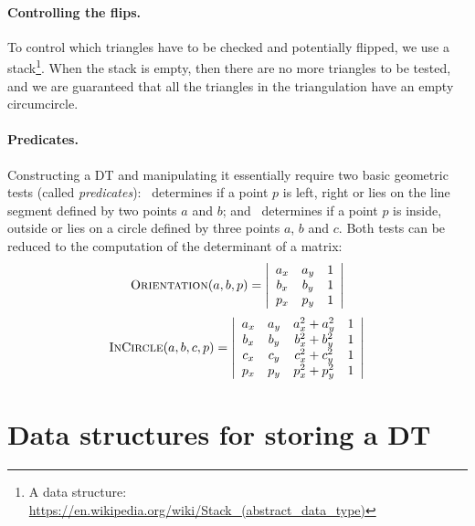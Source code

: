 \paragraph{Controlling the flips.}
To control which triangles have to be checked and potentially flipped, we use a stack\footnote{A data structure: \url{https://en.wikipedia.org/wiki/Stack_(abstract_data_type)}}. 
When the stack is empty, then there are no more triangles to be tested, and we are guaranteed that all the triangles in the triangulation have an empty circumcircle.


\paragraph{Predicates.}
Constructing a DT and manipulating it essentially require two basic geometric tests (called \emph{predicates}): \Orient\ determines if a point $p$ is left, right or lies on the line segment defined by two points $a$ and $b$; and \Incircle\ determines if a point $p$ is inside, outside or lies on a circle defined by three points $a$, $b$ and $c$. 
Both tests can be reduced to the computation of the determinant of a matrix:
\begin{equation}
  \textrm{O}\textsc{rientation}(a, b, p) = 
  \left| 
  \begin{array}{cccc}
    a_{x} & a_{y} & 1 \\
    b_{x} & b_{y} & 1 \\
    p_{x} & p_{y} & 1 
  \end{array} 
  \right| 
\end{equation}
\begin{equation}
  \textrm{I}\textsc{n}\textrm{C}\textsc{ircle}(a, b, c, p) = 
  \left| 
  \begin{array}{ccccc}
    a_{x} & a_{y} & a^{2}_{x} + a^{2}_{y} & 1 \\
    b_{x} & b_{y} & b^{2}_{x} + b^{2}_{y} & 1 \\
    c_{x} & c_{y} & c^{2}_{x} + c^{2}_{y} & 1 \\
    p_{x} & p_{y} & p^{2}_{x} + p^{2}_{y} & 1 
  \end{array} 
  \right|%
\label{eq:insphere}
\end{equation}


\section[DT data structures]{Data structures for storing a DT}

